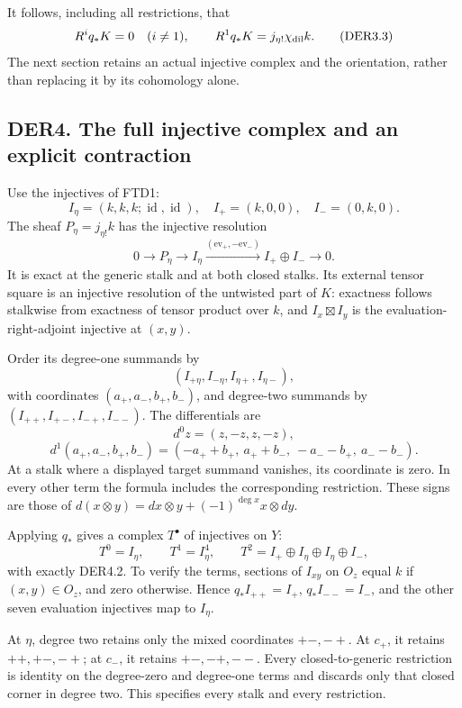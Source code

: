 It follows, including all restrictions, that \[
R^i q_*K=0\quad(i\ne1),\qquad
R^1q_*K=j_{\eta!}\chi_{\rm dil}k.
\tag{DER3.3}
\] The next section retains an actual injective complex and the
orientation, rather than replacing it by its cohomology alone.

\subsection{DER4. The full injective complex and an explicit
contraction}\label{der4.-the-full-injective-complex-and-an-explicit-contraction}

Use the injectives of FTD1: \[
I_\eta=(k,k,k;\operatorname{id},\operatorname{id}),\quad
I_+=(k,0,0),\quad I_-=(0,k,0).
\] The sheaf \(P_\eta=j_{\eta!}k\) has the injective resolution \[
0\to P_\eta\to I_\eta
 \xrightarrow{(\mathrm{ev}_+,-\mathrm{ev}_-)}I_+\oplus I_-\to0.
\tag{DER4.1}
\] It is exact at the generic stalk and at both closed stalks. Its
external tensor square is an injective resolution of the untwisted part
of \(K\): exactness follows stalkwise from exactness of tensor product
over \(k\), and \(I_x\boxtimes I_y\) is the evaluation-right-adjoint
injective at \((x,y)\).

Order its degree-one summands by \[
(I_{+\eta},I_{-\eta},I_{\eta+},I_{\eta-}),
\] with coordinates \((a_+,a_-,b_+,b_-)\), and degree-two summands by
\((I_{++},I_{+-},I_{-+},I_{--})\). The differentials are \[
d^0z=(z,-z,z,-z),
\] \[
d^1(a_+,a_-,b_+,b_-)
=(-a_++b_+,\ a_++b_-,\ -a_--b_+,\ a_--b_-).
\tag{DER4.2}
\] At a stalk where a displayed target summand vanishes, its coordinate
is zero. In every other term the formula includes the corresponding
restriction. These signs are those of
\(d(x\otimes y)=dx\otimes y+(-1)^{\deg x}x\otimes dy\).

Applying \(q_*\) gives a complex \(T^\bullet\) of injectives on \(Y\):
\[
T^0=I_\eta,\qquad T^1=I_\eta^4,\qquad
T^2=I_+\oplus I_\eta\oplus I_\eta\oplus I_-,
\tag{DER4.3}
\] with exactly DER4.2. To verify the terms, sections of \(I_{xy}\) on
\(O_z\) equal \(k\) if \((x,y)\in O_z\), and zero otherwise. Hence
\(q_*I_{++}=I_+\), \(q_*I_{--}=I_-\), and the other seven evaluation
injectives map to \(I_\eta\).

At \(\eta\), degree two retains only the mixed coordinates \(+-,-+\). At
\(c_+\), it retains \(++,+-,-+\); at \(c_-\), it retains \(+-,-+,--\).
Every closed-to-generic restriction is identity on the degree-zero and
degree-one terms and discards only that closed corner in degree two.
This specifies every stalk and every restriction.

